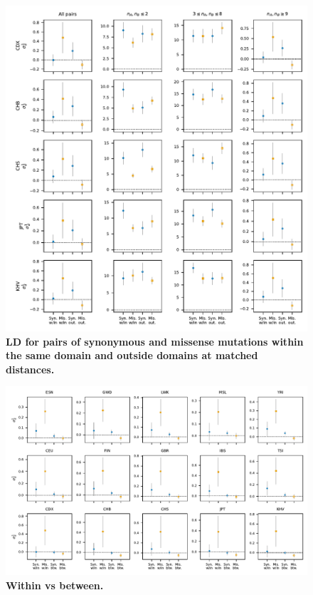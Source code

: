 \documentclass[]{article}
\begin{document}
\begin{figure}[ht!]
    \centering
    \includegraphics{../figures/data_domains_eas}
    \caption{
        \textbf{LD for pairs of synonymous and missense mutations within the
        same domain and outside domains at matched distances.}
    }
    \label{fig:domainsEAS}
\end{figure}

\begin{figure}[ht!]
    \centering
    \includegraphics[width=\textwidth]{../figures/data_within_between}
    \caption{
        \textbf{Within vs between.}
    }
    \label{fig:between_domains}
\end{figure}
\end{document}
